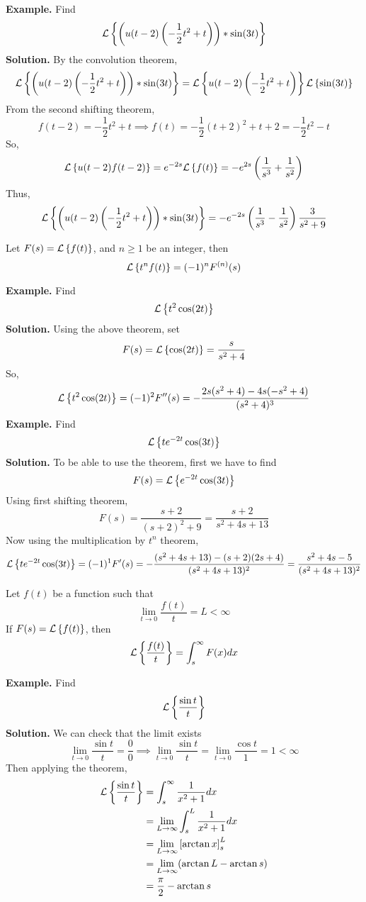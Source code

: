 \documentclass[openany]{report}
\begin{document}
\noindent
\textbf{Example.} Find 
\[\mathcal{L}\left\{\left(u(t-2)\left(-\frac{1}{2}t^2 + t\right)\right)*\sin(3t)\right\}\]
\textbf{Solution.} By the convolution theorem, 
\[\mathcal{L}\left\{\left(u(t-2)\left(-\frac{1}{2}t^2 + t\right)\right)*\sin(3t)\right\} = \mathcal{L}\left\{u(t-2)\left(-\frac{1}{2}t^2 + t\right)\right\}\mathcal{L}\left\{\sin(3t)\right\}\]
From the second shifting theorem, 
\[f(t-2) = -\frac{1}{2}t^2 + t \implies f(t) = -\frac{1}{2}(t+2)^2 + t + 2 = -\frac{1}{2}t^2 - t\]
So, 
\[\mathcal{L}\left\{u(t-2)f(t-2)\right\} = e^{-2s}\mathcal{L}\left\{f(t)\right\} = -e^{2s}\left(\frac{1}{s^3} + \frac{1}{s^2}\right)\]
Thus, 
\[\mathcal{L}\left\{\left(u(t-2)\left(-\frac{1}{2}t^2 + t\right)\right)*\sin(3t)\right\} = -e^{-2s}\left(\frac{1}{s^3} - \frac{1}{s^2}\right)\frac{3}{s^2 + 9} \]
\begin{theorem}[Multiplication by $t^n$]
    Let $F(s) = \mathcal{L}\left\{f(t)\right\}$, and $n \geq 1$ be an integer, then 
    \[\mathcal{L}\left\{t^nf(t)\right\} = (-1)^nF^{(n)}(s)\]
\end{theorem}

\noindent
\textbf{Example.} Find 
\[\mathcal{L}\left\{t^2\cos(2t)\right\}\]
\textbf{Solution.}
Using the above theorem, set 
\[F(s) = \mathcal{L}\left\{\cos(2t)\right\} = \frac{s}{s^2 + 4}\]
So, 
\[\mathcal{L}\left\{t^2\cos(2t)\right\} = (-1)^2F''(s) = -\frac{2s(s^2+4)-4s(-s^2+4)}{(s^2+4)^3}\]
\noindent
\textbf{Example.} Find 
\[\mathcal{L}\left\{te^{-2t}\cos(3t)\right\}\]
\textbf{Solution.} To be able to use the theorem, first we have to find 
\[F(s) = \mathcal{L}\left\{e^{-2t}\cos(3t)\right\}\]
Using first shifting theorem, 
\[F(s) = \frac{s+2}{(s+2)^2 + 9} =  \frac{s + 2}{s^2 + 4s + 13}\]
Now using the multiplication by $t^n$ theorem, 
\[\mathcal{L}\left\{te^{-2t}\cos(3t)\right\} = (-1)^1F'(s) = -\frac{(s^2+4s+13)-(s+2)(2s+4)}{(s^2+4s+13)^2} = \frac{s^2+4s-5}{(s^2+4s+13)^2}\]

\begin{theorem}[Division by $t$]
    Let $f(t)$ be a function such that 
    \[\lim_{t\rightarrow 0} \frac{f(t)}{t} = L < \infty\]
    If $F(s) = \mathcal{L}\left\{f(t)\right\}$, then
    \[\mathcal{L}\left\{\frac{f(t)}{t}\right\} = \int_s^\infty F(x)dx\]
\end{theorem}
\noindent
\textbf{Example.} Find 
\[\mathcal{L}\left\{\frac{\sin t}{t}\right\}\]
\textbf{Solution.} We can check that the limit exists 
\[\lim_{t\rightarrow 0}\frac{\sin t}{t} = \frac{0}{0} \implies \lim_{t\rightarrow 0} \frac{\sin t}{t} = \lim_{t\rightarrow 0}\frac{\cos t}{1} = 1 < \infty\]
Then applying the theorem, 
\begin{align*}
    \mathcal{L}\left\{\frac{\sin  t}{t}\right\} &= \int_s^\infty \frac{1}{x^2 + 1}dx\\
    &= \lim_{L \rightarrow \infty} \int_s^L \frac{1}{x^2+1}dx\\
    &= \lim_{L\rightarrow \infty} \left[\arctan x\right]_s^L \\
    &= \lim_{L \rightarrow \infty} (\arctan L - \arctan s )\\
    &= \frac{\pi}{2} - \arctan s
\end{align*}
\end{document}
